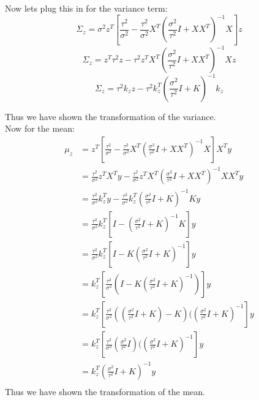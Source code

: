 \documentclass{article}
\newcommand{\1}{\mathbf{1}}
\begin{document}
Now lets plug this in for the variance term:
$$\Sigma_z = \sigma^2 z^T [ \frac{\tau^2}{\sigma^2} - \frac{\tau^2}{\sigma^2} X^T( \frac{\sigma^2}{\tau^2} I + X X^T )^{-1} X  ] z$$
$$\Sigma_z =  z^T  \tau^2  z    -           \tau^2 z^T X^T( \frac{\sigma^2}{\tau^2} I + X X^T )^{-1} X  z$$
$$\Sigma_z =   \tau^2 k_zz   -           \tau^2 k_z^T ( \frac{\sigma^2}{\tau^2} I + K )^{-1} k_z  $$

Thus we have shown the transformation of the variance. \\

Now for the mean:
\begin{align}
    \mu_z & = z^T [ \frac{\tau^2}{\sigma^2} - \frac{\tau^2}{\sigma^2} X^T( \frac{\sigma^2}{\tau^2} I + X X^T )^{-1} X  ]  X^T y \\
    &  = \frac{\tau^2}{\sigma^2} z^T X^T y    - \frac{\tau^2}{\sigma^2} z^T X^T( \frac{\sigma^2}{\tau^2} I + X X^T )^{-1} X X^T y \\
    &  = \frac{\tau^2}{\sigma^2} k_z^T y    - \frac{\tau^2}{\sigma^2} k_z^T ( \frac{\sigma^2}{\tau^2} I + K )^{-1} K y \\
    &  = \frac{\tau^2}{\sigma^2} k_z^T [ I -  ( \frac{\sigma^2}{\tau^2} I + K )^{-1} K ]  y \\
    &  = \frac{\tau^2}{\sigma^2} k_z^T [ I -  K ( \frac{\sigma^2}{\tau^2} I + K )^{-1} ]  y \\
    &  =  k_z^T [ \frac{\tau^2}{\sigma^2} ( I -  K ( \frac{\sigma^2}{\tau^2} I + K )^{-1} ) ]  y \\
    &  =  k_z^T [ \frac{\tau^2}{\sigma^2} ( (\frac{\sigma^2}{\tau^2}I + K) - K ) (( \frac{\sigma^2}{\tau^2} I + K )^{-1} ]  y \\
    &  =  k_z^T [ \frac{\tau^2}{\sigma^2} ( \frac{\sigma^2}{\tau^2}I ) (( \frac{\sigma^2}{\tau^2} I + K )^{-1} ]  y \\
    &  =  k_z^T ( \frac{\sigma^2}{\tau^2} I + K )^{-1}   y \\
\end{align}
Thus we have shown the transformation of the mean. \\


\newpage 
\end{document}
